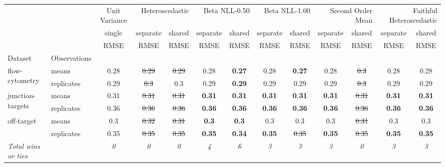 \begin{tabular}{ll|c|cc|cc|cc|cc|cc}
\toprule
{} & {} & {Unit Variance} & \multicolumn{2}{r}{Heteroscedastic} & \multicolumn{2}{r}{Beta NLL-0.50} & \multicolumn{2}{r}{Beta NLL-1.00} & \multicolumn{2}{r}{Second Order Mean} & \multicolumn{2}{r}{Faithful Heteroscedastic} \\
{} & {} & {single} & {separate} & {shared} & {separate} & {shared} & {separate} & {shared} & {separate} & {shared} & {separate} & {shared} \\
{} & {} & {RMSE} & {RMSE} & {RMSE} & {RMSE} & {RMSE} & {RMSE} & {RMSE} & {RMSE} & {RMSE} & {RMSE} & {RMSE} \\
{Dataset} & {Observations} & {} & {} & {} & {} & {} & {} & {} & {} & {} & {} & {} \\
\midrule
\multirow[t]{2}{*}{flow-cytometry} & means & 0.28 & \sout{0.29} & \sout{0.29} & 0.28 & \textbf{0.27} & 0.28 & \textbf{0.27} & 0.28 & \sout{0.3} & 0.28 & 0.28 \\
 & replicates & 0.29 & \sout{0.3} & 0.3 & 0.29 & \textbf{0.29} & 0.29 & 0.29 & 0.29 & \sout{0.3} & 0.29 & 0.29 \\
\multirow[t]{2}{*}{junction-targets} & means & 0.31 & \sout{0.31} & \sout{0.31} & \textbf{0.31} & \textbf{0.31} & \textbf{0.31} & \textbf{0.31} & \textbf{0.31} & \sout{0.31} & \textbf{0.31} & \textbf{0.31} \\
 & replicates & 0.36 & \sout{0.36} & \sout{0.36} & \textbf{0.36} & \textbf{0.36} & \textbf{0.36} & \textbf{0.36} & \textbf{0.36} & \sout{0.36} & \textbf{0.36} & \textbf{0.36} \\
\multirow[t]{2}{*}{off-target} & means & 0.3 & \sout{0.32} & \sout{0.31} & \textbf{0.3} & \textbf{0.3} & 0.3 & 0.3 & 0.3 & \sout{0.31} & 0.3 & 0.3 \\
 & replicates & 0.35 & \sout{0.35} & \sout{0.35} & \textbf{0.35} & \textbf{0.34} & \textbf{0.35} & \sout{0.35} & \textbf{0.35} & \sout{0.35} & \textbf{0.35} & \textbf{0.35} \\
\textit{{Total wins or ties}} &  & \textit{0} & \textit{0} & \textit{0} & \textit{4} & \textit{6} & \textit{3} & \textit{3} & \textit{3} & \textit{0} & \textit{3} & \textit{3} \\
\bottomrule
\end{tabular}
